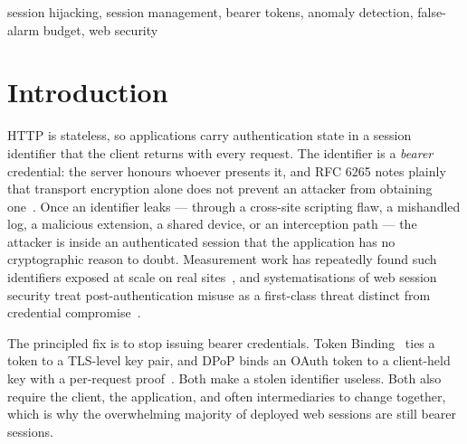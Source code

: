 \documentclass[conference]{IEEEtran}
\begin{document}
\begin{abstract}
Detection is near-complete against an off-network adversary and falls to the
noise floor against one that reproduces the victim's subnet \emph{and} agent; we
report that boundary rather than averaging across it.  Two cells sharpen it: an
agent-cloning attacker is caught almost always when the victim keeps browsing and
almost never when the victim stops, and an attacker at the victim's own address
who merely runs a different client program is still caught
\recLfiveConcurrentWeb\ of the time while the victim browses --- so what the
evidence requires is a binding inconsistency, not an address change.  Almost every false
alarm we observe comes from one phenomenon --- a client whose binding moves
across \texttt{/16} boundaries mid-session, overwhelmingly transient interface
flapping --- and none at all from the pooled unmodified real sessions of either
corpus.
\end{abstract}

\begin{IEEEkeywords}
session hijacking, session management, bearer tokens, anomaly detection,
false-alarm budget, web security
\end{IEEEkeywords}

\section{Introduction}

HTTP is stateless, so applications carry authentication state in a session
identifier that the client returns with every request.  The identifier is a
\emph{bearer} credential: the server honours whoever presents it, and RFC 6265
notes plainly that transport encryption alone does not prevent an attacker from
obtaining one~\cite{rfc6265}.  Once an identifier leaks --- through a
cross-site scripting flaw, a mishandled log, a malicious extension, a shared
device, or an interception path --- the attacker is inside an authenticated
session that the application has no cryptographic reason to doubt.  Measurement
work has repeatedly found such identifiers exposed at scale on real
sites~\cite{sivakorn2016cookie}, and systematisations of web session security
treat post-authentication misuse as a first-class threat distinct from
credential compromise~\cite{calzavara2017surviving,calzavara2019subsession}.

The principled fix is to stop issuing bearer credentials.  Token
Binding~\cite{rfc8471} ties a token to a TLS-level key pair, and DPoP binds an
OAuth token to a client-held key with a per-request
proof~\cite{rfc9449}.  Both make a stolen identifier useless.  Both also
require the client, the application, and often intermediaries to change
together, which is why the overwhelming majority of deployed web sessions are
still bearer sessions.
\end{document}
